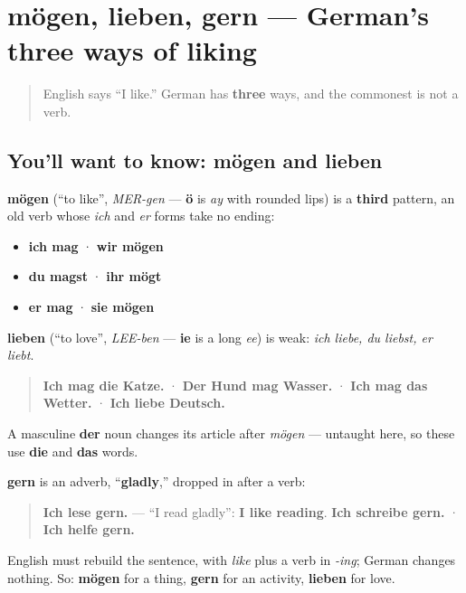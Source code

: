 \section[mögen, lieben]{mögen, lieben, gern — German's three ways of liking}

\label{lesson:GE-C25-moegen-lieben}



\begin{quote}
English says \textquotedblleft{}I like.\textquotedblright{} German has \textbf{three} ways, and the commonest is not a verb.
\end{quote}

\subsection*{You'll want to know: mögen and lieben}
\textbf{mögen} (\textquotedblleft{}to like\textquotedblright{}, \emph{MER-gen} — \textbf{ö} is \emph{ay} with rounded lips) is a \textbf{third} pattern, an old verb whose \emph{ich} and \emph{er} forms take no ending:

\begin{itemize}
\raggedright
  \item \textbf{ich mag} · \textbf{wir mögen}
  \item \textbf{du magst} · \textbf{ihr mögt}
  \item \textbf{er mag} · \textbf{sie mögen}
\end{itemize}

\textbf{lieben} (\textquotedblleft{}to love\textquotedblright{}, \emph{LEE-ben} — \textbf{ie} is a long \emph{ee}) is weak: \emph{ich liebe, du liebst, er liebt}.

\begin{quote}
\textbf{Ich mag die Katze.} · \textbf{Der Hund mag Wasser.} · \textbf{Ich mag das Wetter.} · \textbf{Ich liebe Deutsch.}
\end{quote}

A masculine \textbf{der} noun changes its article after \emph{mögen} — untaught here, so these use \textbf{die} and \textbf{das} words.

\begin{grammarlens}[title={Grammar Lens: gern hangs on any verb}]
\textbf{gern} is an adverb, \textquotedblleft{}\textbf{gladly},\textquotedblright{} dropped in after a verb:

\begin{quote}
\textbf{Ich lese gern.} — \textquotedblleft{}I read gladly\textquotedblright{}: \textbf{I like reading}. \textbf{Ich schreibe gern.} · \textbf{Ich helfe gern.}
\end{quote}

English must rebuild the sentence, with \emph{like} plus a verb in \emph{-ing}; German changes nothing. So: \textbf{mögen} for a thing, \textbf{gern} for an activity, \textbf{lieben} for love.
\end{grammarlens}

